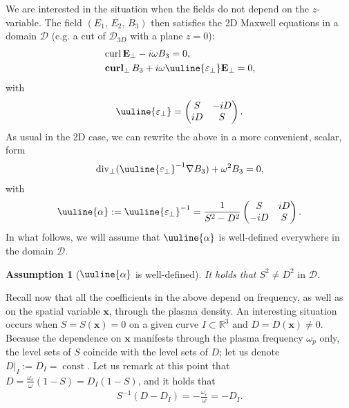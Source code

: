 \documentclass[report]{elsarticle}
\newtheorem{assumption}[theorem]{Assumption}
\numberwithin{theorem}{section}
\renewcommand{\vec}[1]{\mathbf{#1}}
\begin{document}
We are interested in the situation when the fields do not depend on the $z$-variable. The field $(E_1, \, E_2, \, B_3)$ then satisfies the 2D Maxwell equations in a domain $\mathcal{D}$  (e.g. a cut of $\mathcal{D}_{3D}$ with a plane $z=0$):
\begin{align*}
	&\operatorname{curl}\mathbf{E}_{\perp}-i\omega B_3=0,\\
	&\operatorname{\mathbf{curl}}_{\perp}B_3+i\omega \uuline{\varepsilon_{\perp}}\mathbf{E}_{\perp}=0,
\end{align*}
with 
\begin{align*}
	\uuline{\varepsilon_{\perp}}=\left(
\begin{matrix}
	S & -iD \\
	iD & S 
\end{matrix}
\right).
\end{align*}
As usual in the 2D case, we can rewrite the above in a more convenient, scalar, form
\begin{align}
	\label{eq:divB}
	\operatorname{div}_{\perp}(	\uuline{\varepsilon_{\perp}}^{-1}\nabla B_3)+\omega^2 B_3=0,
\end{align}
with 
\begin{align}
	\label{eq:uualpha}
\uuline{\alpha}:=\uuline{\varepsilon_{\perp}}^{-1}=\frac{1}{S^2-D^2}\left(
	\begin{matrix}
		S & iD \\
		-iD & S
	\end{matrix}
\right).
\end{align}
In what follows, we will assume that $\uuline{\alpha}$ is well-defined everywhere in the domain $\mathcal{D}$.
\begin{assumption}[$\uuline{\alpha}$ is well-defined]
	\label{assump:SD}
It holds that $S^2\neq D^2 \text{ in }\mathcal{D}$. 
\end{assumption}
Recall now that all the coefficients in the above depend on frequency, as well as on the spatial variable $\vec{x}$, through the plasma density. 
An interesting situation occurs when $S=S(\vec{x})=0$ on a given curve $I\subset \mathbb{R}^3$ and $D=D(\vec{x})\neq 0$. 
Because the dependence on $\vec{x}$ manifests through the plasma frequency $\omega_p$ only, the level sets of $S$ coincide with the level sets of $D$; let us denote $\left. D\right|_{I}:=D_I=\operatorname{const}$. Let us remark at this point that $D=\frac{\omega_c}{\omega}(1-S)=D_I(1-S)$, and it holds that 
\begin{align}
	\label{eq:SD}
	S^{-1}(D-D_{I})=-\frac{\omega_c}{\omega}=-D_I.
\end{align}
\end{document}
